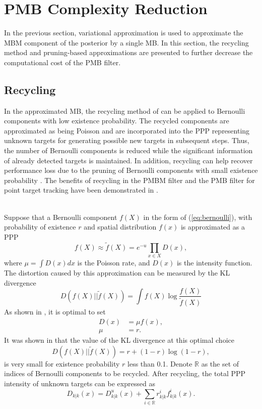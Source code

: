 \section{PMB Complexity Reduction}
In the previous section, variational approximation is used to approximate the MBM component of the posterior by a single MB. In this section, the recycling method \cite{recycle} and pruning-based approximations are presented to further decrease the computational cost of the PMB filter. 

\subsection{Recycling}
In the approximated MB, the recycling method of \cite{recycle} can be applied to Bernoulli components with low existence probability. The recycled components are approximated as being Poisson and are incorporated into the PPP representing unknown targets for generating possible new targets in subsequent steps. Thus, the number of Bernoulli components is reduced while the significant information of already detected targets is maintained. In addition, recycling can help recover performance loss due to the pruning of Bernoulli components with small existence probability \cite{lbp}. The benefits of recycling in the PMBM filter and the PMB filter for point target tracking have been demonstrated in \cite{performanceevaluation}.

~\\
Suppose that a Bernoulli component $f(X)$ in the form of (\ref{eq:bernoulli}), with probability of existence $r$ and spatial distribution $f(x)$ is approximated as a PPP
\begin{equation}
    f(X) \approx \tilde{f}(X) = e^{-u}\prod_{x\in X}D(x),
\end{equation}
where $\mu = \int D(x)dx$ is the Poisson rate, and $D(x)$ is the intensity function. The distortion caused by this approximation can be measured by the KL divergence \cite[p. 513]{rfs}
\begin{equation}
    D(f(X)||\tilde{f}(X)) = \int f(X)\log\frac{f(X)}{\tilde{f}(X)}
\end{equation}
As shown in \cite[p. 579]{rfs}, it is optimal to set
\begin{subequations}
\begin{align}
    D(x) &= \mu f(x),\\
    \mu &= r.
\end{align}
\end{subequations}
It was shown in \cite{recycle} that the value of the KL divergence at this optimal choice
\begin{equation}
    D(f(X)||\tilde{f}(X)) = r + (1-r)\log(1-r),
\end{equation}
is very small for existence probability $r$ less than 0.1. Denote $\mathbb{R}$ as the set of indices of Bernoulli components to be recycled. After recycling, the total PPP intensity of unknown targets can be expressed as
\begin{equation}
    D_{k|k}(x) = D^u_{k|k}(x) + \sum_{i\in\mathbb{R}}r^i_{k|k}f^i_{k|k}(x).
\end{equation}

